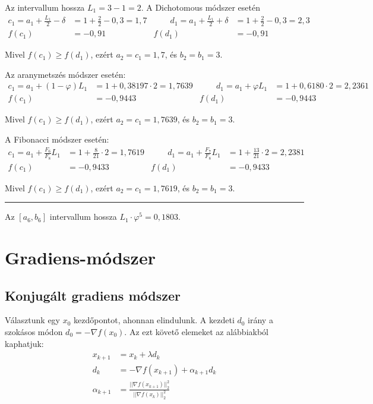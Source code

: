 \documentclass[a4paper,12pt,svgnames]{report}
\begin{document}
\begin{multicols}{2}
\begin{megoldas}
Az intervallum hossza $L_1=3-1=2$. A Dichotomous módszer esetén
\begin{alignat*}{4}
c_1=a_1+\frac{L_1}{2}-\delta&=1+\frac{2}{2}-0,3=1,7 &\qquad d_1=a_1+\frac{L_1}{2}+\delta&=1+\frac{2}{2}-0,3=2,3\\
f(c_1)&=-0,91 & f(d_1)&=-0,91
\end{alignat*}

Mivel $f(c_1)\geq f(d_1)$, ezért $a_2=c_1=1,7$, és $b_2=b_1=3$.

Az aranymetszés módszer esetén:
\begin{alignat*}{4}
c_1=a_1+(1-\varphi)L_1&=1+0,38197\cdot2=1,7639&\qquad d_1=a_1+\varphi L_1&=1+0,6180\cdot2=2,2361\\
f(c_1)&=-0,9443&f(d_1)&=-0,9443
\end{alignat*}

Mivel $f(c_1)\geq f(d_1)$, ezért $a_2=c_1=1,7639$, és $b_2=b_1=3$.

A Fibonacci módszer esetén:
\begin{alignat*}{4}
c_1=a_1+\frac{F_6}{F_8}L_1&=1+\frac{8}{21}\cdot2=1,7619&\qquad d_1=a_1+\frac{F_7}{F_8}L_1&=1+\frac{13}{21}\cdot2=2,2381\\
f(c_1)&=-0,9433&f(d_1)&=-0,9433
\end{alignat*}

Mivel $f(c_1)\geq f(d_1)$, ezért $a_2=c_1=1,7619$, és $b_2=b_1=3$.

\medskip\hrule\medskip

Az $[a_6,b_6]$ intervallum hossza $L_1\cdot\varphi^5=0,1803$.

\end{megoldas}

\section{Gradiens-módszer}

\subsection{Konjugált gradiens módszer}

\firstline Választunk egy $x_0$ kezdőpontot, ahonnan elindulunk. A kezdeti $d_0$ irány a szokásos módon $d_0=-\nabla f(x_0)$. Az ezt követő elemeket az alábbiakból kaphatjuk:
\begin{align*}
x_{k+1}&=x_k+\lambda d_k\\
d_k&=-\nabla f(x_{k+1})+\alpha_{k+1}d_k\\
\alpha_{k+1}&=\frac{||\nabla f(x_{k+1})||_2^2}{||\nabla f(x_{k})||_2^2}
\end{align*}


\end{multicols}
\end{document}
